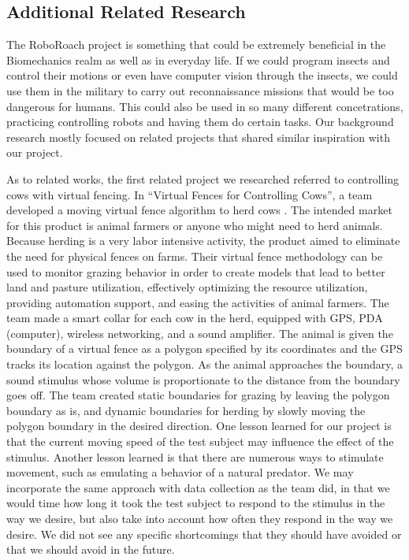 \documentclass{article}
\begin{document}
\subsection{Additional Related Research}
\par The RoboRoach project is something that could be extremely beneficial in the Biomechanics realm as well as in everyday life. If we could program insects and control their motions or even have computer vision through the insects, we could use them in the military to carry out reconnaissance missions that would be too dangerous for humans. This could also be used in so many different concetrations, practicing controlling robots and having them do certain tasks. Our background research mostly focused on related projects that shared similar inspiration with our project. 

\par As to related works, the first related project we researched referred to controlling cows with virtual fencing. In ``Virtual Fences for Controlling Cows'', a team developed a moving virtual fence algorithm to herd cows \cite{butler2004virtual}. The intended market for this product is animal farmers or anyone who might need to herd animals. Because herding is a very labor intensive activity, the product aimed to eliminate the need for physical fences on farms. Their virtual fence methodology can be used to monitor grazing behavior in order to create models that lead to better land and pasture utilization, effectively optimizing the resource utilization, providing automation support, and easing the activities of animal farmers. The team made a smart collar for each cow in the herd, equipped with GPS, PDA (computer), wireless networking, and a sound amplifier. The animal is given the boundary of a virtual fence as a polygon specified by its coordinates and the GPS tracks its location against the polygon. As the animal approaches the boundary, a sound stimulus whose volume is proportionate to the distance from the boundary goes off. The team created static boundaries for grazing by leaving the polygon boundary as is, and dynamic boundaries for herding by slowly moving the polygon boundary in the desired direction. One lesson learned for our project is that the current moving speed of the test subject may influence the effect of the stimulus. Another lesson learned is that there are numerous ways to stimulate movement, such as emulating a behavior of a natural predator. We may incorporate the same approach with data collection as the team did, in that we would time how long it took the test subject to respond to the stimulus in the way we desire, but also take into account how often they respond in the way we desire. We did not see any specific shortcomings that they should have avoided or that we should avoid in the future. 
\end{document}
